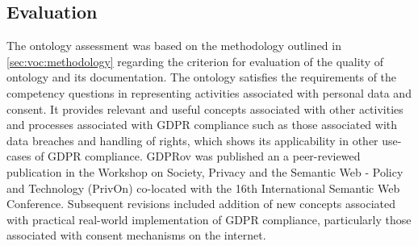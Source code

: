 \subsection{Evaluation}
The ontology assessment was based on the methodology outlined in \autoref{sec:voc:methodology} regarding the criterion for evaluation of the quality of ontology and its documentation.
The ontology satisfies the requirements of the competency questions in representing activities associated with personal data and consent.
It provides relevant and useful concepts associated with other activities and processes associated with GDPR compliance such as those associated with data breaches and handling of rights, which shows its applicability in other use-cases of GDPR compliance.
GDPRov was published \cite{pandit_modelling_2017} an a peer-reviewed publication in the Workshop on Society, Privacy and the Semantic Web - Policy and Technology (PrivOn) co-located with the 16th International Semantic Web Conference. 
Subsequent revisions included addition of new concepts associated with practical real-world implementation of GDPR compliance, particularly those associated with consent mechanisms on the internet.

